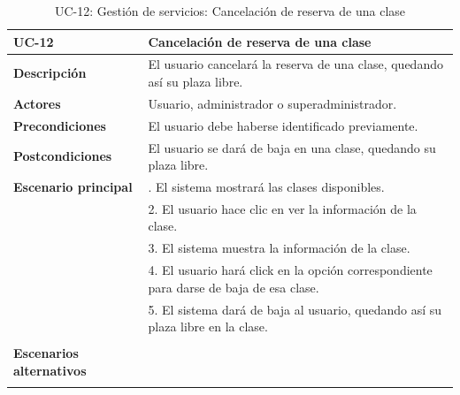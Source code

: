 \begin{table}
  \begin{center}
    \begin{tabularx}{16.4cm}{|l|X|}
      \hline
      \textbf{UC-12} & \textbf{Cancelación de reserva de una clase}\\
      \hline
      \textbf{Descripción} & El usuario cancelará la reserva de una clase, quedando así su plaza libre.\\
      \hline
      \textbf{Actores} & Usuario, administrador o superadministrador.\\
      \hline
      \textbf{Precondiciones} & El usuario debe haberse identificado previamente.\\
      \hline
      \textbf{Postcondiciones} & El usuario se dará de baja en una clase, quedando su plaza libre.\\
      \hline
      \textbf{Escenario principal} & \smallskip 1. El sistema mostrará las clases disponibles.\\
      & 2. El usuario hace clic en ver la información de la clase.\\
      & 3. El sistema muestra la información de la clase.\\
      & 4. El usuario hará click en la opción correspondiente para darse de baja de esa clase.\\
      & 5. El sistema dará de baja al usuario, quedando así su plaza libre en la clase. \\
      & \\
      \hline
      \textbf{Escenarios alternativos} & \\ 
      & \\
      \hline
    \end{tabularx}
    \caption{UC-12: Gestión de servicios: Cancelación de reserva de una clase}
    \label{tab:CU-cancelar-reserva-clase}
  \end{center}
\end{table}


